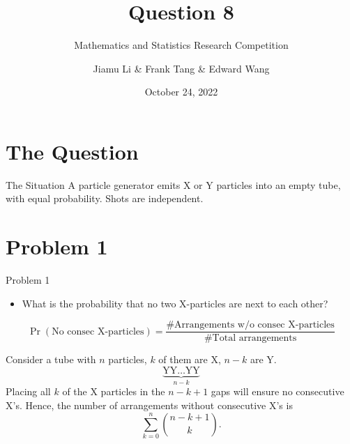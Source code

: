 \documentclass[xcolor={usenames,dvipsnames}]{beamer}
\title{Question 8}
\subtitle{Mathematics and Statistics Research Competition}
\author{Jiamu Li \& Frank Tang \& Edward Wang}
\institute{Scotch College}
\date{October 24, 2022}
\DeclareMathOperator{\prob}{Pr}
\begin{document}
\begin{frame}
  \titlepage
\end{frame}


\section{The Question}
\begin{frame}{The Situation}
  A particle generator emits X or Y particles into an empty tube, with equal probability. Shots are independent.
  \begin{center}
    
  \end{center}
\end{frame}
\section{Problem 1}
\begin{frame}{Problem 1}
\begin{itemize}
  \item What is the probability that no two X-particles are next to each other?
\end{itemize}

\begin{equation*}
  \prob(\text{No consec X-particles}) = \frac{\# \text{Arrangements w/o consec X-particles}}{\# \text{Total arrangements}}
\end{equation*}

\end{frame}

\begin{frame}

  Consider a tube with $n$ particles, $k$ of them are X, $n-k$ are Y.
  \begin{equation*}
    \underbrace{\text{YY}\dots\text{YY}}_{n-k}
  \end{equation*}
  Placing all $k$ of the X particles in the $n-k+1$ gaps will ensure no consecutive X's. Hence, the number of arrangements without consecutive X's is
  \begin{equation*}
    \sum_{k=0}^n \binom{n-k+1}{k}.
  \end{equation*}

\end{frame}
\end{document}
